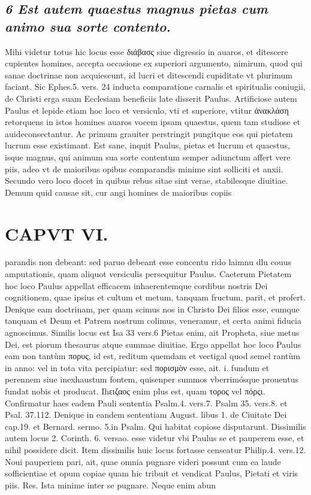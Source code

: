 \documentclass{article}
\begin{document}
\begin{pages}
\subsection*{\textit{6 Est autem quaestus magnus pietas cum animo sua sorte contento. }}\pstart Mihi videtur totus hic locus esse διάβασς siue digressio in auaros, et ditescere cupientes homines, accepta occasione ex superiori argumento, nimirum, quod qui sanae doctrinae non acquiescunt, id lucri et ditescendi cupiditate vt plurimum faciant. Sic Ephes.5. vers. 24 inducta comparatione carnalis et spiritualis coniugii, de Christi erga suam Ecclesiam beneficiis late disserit Paulus. Artificiose autem Paulus et lepide etiam hoc loco et versiculo, vti et superiore, vtitur ἀνακλάση retorquens in istos homines auaros vocem ipsam quaestus, quem tam studiose et auideconsectantur. Ac primum grauiter perstringit pungitque eos qui pietatem lucrum esse existimant. Est sane, inquit Paulus, pietas et lucrum et quaestus, isque magnus, qui animum sua sorte contentum semper adiunctum affert vere piis, adeo vt de maioribus opibus comparandis minime sint solliciti et anxii. Secundo vero loco docet in quibus rebus sitae sint verae, stabilesque diuitiae. Demum quid causae sit, cur angi homines de maioribus copiis  \pend
\section*{CAPVT  VI. }
\marginpar{[ p.431 ]}\pstart parandis non debeant: sed paruo debeant esse concentu rido laimnu dlu couus amputationis, quam aliquot versiculis persequitur Paulus.  \pend\pstart Caeterum Pietatem hoc loco Paulus appellat efficacem inhaerentemque cordibus nostris Dei cognitionem, quae ipsius et cultum et metum, tanquam fructum, parit, et profert. Denique eam doctrinam, per quam scimus nos in Christo Dei filios esse, eumque tanquam et Deum et Patrem nostrum colimus, veneramur, et certa animi fiducia agnoscimus.  \pend\pstart Similis locus est Isa 33 vers.6 Pietas enim, ait Propheta, siue metus Dei, est piorum thesaurus atque summae diuitiae. Ergo appellat hoc loco Paulus eam non tantùm πορυς, id est, reditum quemdam et vectigal quod semel rantùm in anno: vel in tota vita percipiatur: sed πορισμὸν esse, ait. i. fundum et perennem siue inexhaustum fontem, quisenper summos vberrimósque prouentus fundat nobis et producat. Ihειζαος enim plus est, quam τορος vel πόρςι. Confirmatur haes eadem Pauli sententia Psalm.4. vers.7. Psalm 35. vers.8. et Psal. 37.112. Denique in eandem sententiam August. libus 1. de Ciuitate Dei cap.19. et Bernard. sermo. 5.in Psalm. Qui habitat copiose disputarunt.  \pend\pstart Dissimilis autem locus 2. Corinth. 6. versao. esse videtur vbi Paulus se et pauperem esse, et nihil possidere dicit. Item dissimilis huic locus fortasse censeatur Philip.4. vers.12. Noui pauperiem pari, ait, quae omnia pugnare videri possunt cum ea laude sofficientiae et opum copiae quam hic tribuit et vendicat Paulus, Pietati et viris piis. Res. Ista minime inter se pugnare. Neque enim abun\pend

\end{pages}
\end{document}
